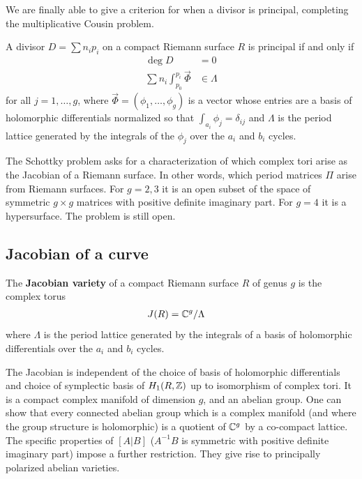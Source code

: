 \documentclass[12pt]{article}
\begin{document}
We are finally able to give a criterion for when a divisor is principal, completing the multiplicative Cousin problem.
\begin{theorem}
    A divisor $D = \sum n_i p_i$ on a compact Riemann surface $R$ is principal if and only if \begin{align*}
        \deg D & = 0 \\
        \sum n_i \int_{p_0}^{p_i} \vec{\Phi} & \in \Lambda
    \end{align*} for all $j=1, \ldots, g$, where $\vec{\Phi} = (\phi_1, \ldots, \phi_g)$ is a vector whose entries are a basis of holomorphic differentials normalized so that $\int_{a_i} \phi_j = \delta_{ij}$ and $\Lambda$ is the period lattice generated by the integrals of the $\phi_j$ over the $a_i$ and $b_i$ cycles.  
\end{theorem}

\begin{remark}
    The Schottky problem asks for a characterization of which complex tori arise as the Jacobian of a Riemann surface. In other words, which period matrices $\Pi$ arise from Riemann surfaces. For $g=2,3$ it is an open subset of the space of symmetric $g \times g$ matrices with positive definite imaginary part. For $g=4$ it is a hypersurface. The problem is still open.
\end{remark}

\subsection{Jacobian of a curve}

\begin{definition}
    The \textbf{Jacobian variety} of a compact Riemann surface $R$ of genus $g$ is the complex torus \begin{align*}
        J(R) & = \mathbb{C}^g / \Lambda
    \end{align*} where $\Lambda$ is the period lattice generated by the integrals of a basis of holomorphic differentials over the $a_i$ and $b_i$ cycles.
\end{definition}
The Jacobian is independent of the choice of basis of holomorphic differentials and choice of symplectic basis of $H_1(R, \mathbb{Z})$ up to isomorphism of complex tori. It is a compact complex manifold of dimension $g$, and an abelian group. One can show that every connected abelian group which is a complex manifold (and where the group structure is holomorphic) is a quotient of $\mathbb{C}^g$ by a co-compact lattice. The specific properties of $[A|B]$ ($A^{-1}B$ is symmetric with positive
definite imaginary part) impose a further restriction. They give rise to principally polarized abelian varieties.
\end{document}
